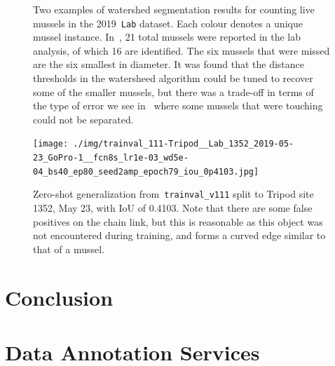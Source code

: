 \documentclass[11pt]{article} %
\begin{document}
\begin{figure}
\centering
{}
\caption{Two examples of watershed segmentation results for counting live
mussels in the 2019~\texttt{Lab} dataset. Each colour denotes a unique mussel
instance. 
In~, 21 total mussels were reported in 
the lab analysis, of which 16 are identified. The six mussels that were 
missed are the six smallest in diameter. It was found that the distance 
thresholds in the watersheed algorithm could be tuned to recover some of the 
smaller mussels, but there was a trade-off in terms of the type of error we see 
in~ where some mussels that were touching could 
not be separated.}
\label{fig:watershed-samples}
\end{figure}

\begin{figure}
\centering
\texttt{[image: ./img/trainval\_111-Tripod\_\_Lab\_1352\_2019-05-23\_GoPro-1\_\_fcn8s\_lr1e-03\_wd5e-04\_bs40\_ep80\_seed2amp\_epoch79\_iou\_0p4103.jpg]}
\caption{Zero-shot generalization from~\texttt{trainval\_v111} split to Tripod
site 1352, May 23, with IoU of 0.4103. Note that there are some false positives
on the chain link, but this is reasonable as this object was not encountered
during training, and forms a curved edge similar to that of a mussel.}
\label{fig:tripod-1352}
\end{figure}


\section{Conclusion}

\clearpage


\clearpage

\appendix

\section{Data Annotation Services}
\end{document}
